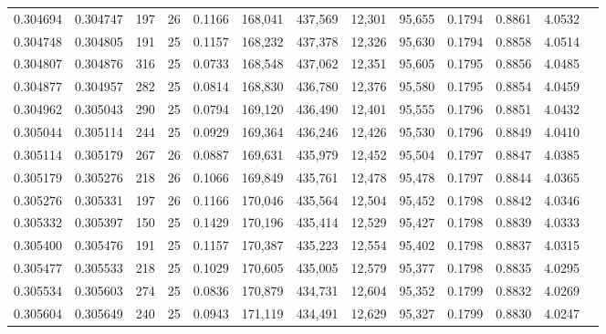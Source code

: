 \begin{tabular}{rrrrrrrrrrrrr}
0.304694 & 0.304747 &   197 &  26 &                                     0.1166 & 168,041 & 437,569 &  12,301 &  95,655 & 0.1794 & 0.8861 & 4.0532 \\
0.304748 & 0.304805 &   191 &  25 &                                     0.1157 & 168,232 & 437,378 &  12,326 &  95,630 & 0.1794 & 0.8858 & 4.0514 \\
0.304807 & 0.304876 &   316 &  25 &                                     0.0733 & 168,548 & 437,062 &  12,351 &  95,605 & 0.1795 & 0.8856 & 4.0485 \\
0.304877 & 0.304957 &   282 &  25 &                                     0.0814 & 168,830 & 436,780 &  12,376 &  95,580 & 0.1795 & 0.8854 & 4.0459 \\
0.304962 & 0.305043 &   290 &  25 &                                     0.0794 & 169,120 & 436,490 &  12,401 &  95,555 & 0.1796 & 0.8851 & 4.0432 \\
0.305044 & 0.305114 &   244 &  25 &                                     0.0929 & 169,364 & 436,246 &  12,426 &  95,530 & 0.1796 & 0.8849 & 4.0410 \\
0.305114 & 0.305179 &   267 &  26 &                                     0.0887 & 169,631 & 435,979 &  12,452 &  95,504 & 0.1797 & 0.8847 & 4.0385 \\
0.305179 & 0.305276 &   218 &  26 &                                     0.1066 & 169,849 & 435,761 &  12,478 &  95,478 & 0.1797 & 0.8844 & 4.0365 \\
0.305276 & 0.305331 &   197 &  26 &                                     0.1166 & 170,046 & 435,564 &  12,504 &  95,452 & 0.1798 & 0.8842 & 4.0346 \\
0.305332 & 0.305397 &   150 &  25 &                                     0.1429 & 170,196 & 435,414 &  12,529 &  95,427 & 0.1798 & 0.8839 & 4.0333 \\
0.305400 & 0.305476 &   191 &  25 &                                     0.1157 & 170,387 & 435,223 &  12,554 &  95,402 & 0.1798 & 0.8837 & 4.0315 \\
0.305477 & 0.305533 &   218 &  25 &                                     0.1029 & 170,605 & 435,005 &  12,579 &  95,377 & 0.1798 & 0.8835 & 4.0295 \\
0.305534 & 0.305603 &   274 &  25 &                                     0.0836 & 170,879 & 434,731 &  12,604 &  95,352 & 0.1799 & 0.8832 & 4.0269 \\
0.305604 & 0.305649 &   240 &  25 &                                     0.0943 & 171,119 & 434,491 &  12,629 &  95,327 & 0.1799 & 0.8830 & 4.0247 \\

\end{tabular}
